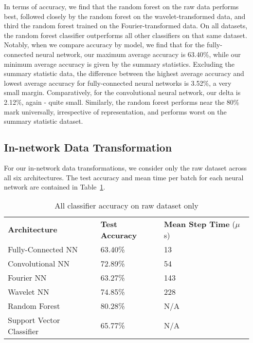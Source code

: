 In terms of accuracy, we find that the random forest on the raw data performs best, followed closely by the random forest on the wavelet-transformed data, and third the random forest trained on the Fourier-transformed data. 
On all datasets, the random forest classifier outperforms all other classifiers on that same dataset.
Notably, when we compare accuracy by model, we find that for the fully-connected neural network, our maximum average accuracy is 63.40\%, while our minimum average accuracy is given by the summary statistics.
Excluding the summary statistic data, the difference between the highest average accuracy and lowest average accuracy for fully-connected neural networks is 3.52\%, a very small margin. 
Comparatively, for the convolutional neural network, our delta is 2.12\%, again - quite small. 
Similarly, the random forest performs near the 80\% mark universally, irrespective of representation, and performs worst on the summary statistic dataset.

\subsection{In-network Data Transformation}
For our in-network data transformations, we consider only the raw dataset across all six architectures.
The test accuracy and mean time per batch for each neural network are contained in Table~\ref{Tab:test_arch}.

\begin{table}[h]
\begin{tabular}{l|ll}
\textbf{Architecture}  & \textbf{Test Accuracy} & \textbf{Mean Step Time} ($\mu$s) \\\cline{1-3}
Fully-Connected NN            & 63.40\%         & 13\\
Convolutional NN              & 72.89\%         & 54\\  
Fourier NN                    & 63.27\%         & 143\\
Wavelet NN                    & 74.85\%         & 228\\
Random Forest                 & 80.28\%         & N/A\\ 
Support Vector Classifier     & 65.77\%         & N/A       
\end{tabular}
\caption{All classifier accuracy on raw dataset only}
\label{Tab:test_arch}	
\centering
\end{table}


